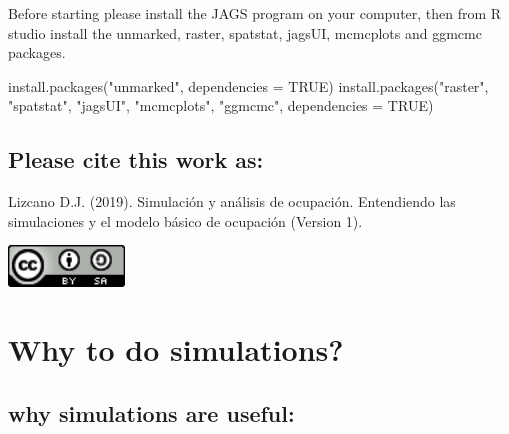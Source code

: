 \documentclass[
]{book}
\newenvironment{Shaded}{\begin{snugshade}}{\end{snugshade}}
\newcommand{\AttributeTok}[1]{\textcolor[rgb]{0.77,0.63,0.00}{#1}}
\newcommand{\ConstantTok}[1]{\textcolor[rgb]{0.00,0.00,0.00}{#1}}
\newcommand{\FunctionTok}[1]{\textcolor[rgb]{0.00,0.00,0.00}{#1}}
\newcommand{\NormalTok}[1]{#1}
\newcommand{\StringTok}[1]{\textcolor[rgb]{0.31,0.60,0.02}{#1}}
\begin{document}
Before starting please install the JAGS program on your computer, then from R studio install the unmarked, raster, spatstat, jagsUI, mcmcplots and ggmcmc packages.

\begin{Shaded}
\begin{Highlighting}[]
\FunctionTok{install.packages}\NormalTok{(}\StringTok{"unmarked"}\NormalTok{, }\AttributeTok{dependencies =} \ConstantTok{TRUE}\NormalTok{)}
\FunctionTok{install.packages}\NormalTok{(}\StringTok{"raster"}\NormalTok{, }\StringTok{"spatstat"}\NormalTok{, }\StringTok{"jagsUI"}\NormalTok{, }\StringTok{"mcmcplots"}\NormalTok{, }\StringTok{"ggmcmc"}\NormalTok{, }\AttributeTok{dependencies =} \ConstantTok{TRUE}\NormalTok{)}
\end{Highlighting}
\end{Shaded}

\hypertarget{please-cite-this-work-as}{%
\section{Please cite this work as:}\label{please-cite-this-work-as}}

Lizcano D.J.
(2019). Simulación y análisis de ocupación. Entendiendo las simulaciones y el modelo básico de ocupación (Version 1).

\begin{flushleft}\includegraphics[width=1.22in]{images/by-sa-88x31} \end{flushleft}

\hypertarget{why}{%
\chapter{Why to do simulations?}\label{why}}

\hypertarget{why-simulations-are-useful}{%
\section{why simulations are useful:}\label{why-simulations-are-useful}}
\end{document}
